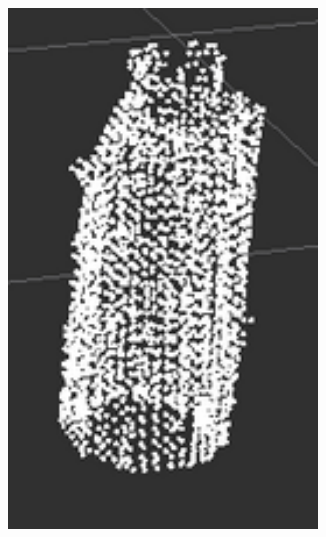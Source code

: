 \begin{figure}[htb]
\begin{subfigure}[b]{0.3\textwidth}
\begin{center}
			\includegraphics[width=0.9\textwidth]{graphics/07_modelling/bottle.png}
			\end{center}
        \end{subfigure} 
        \begin{subfigure}[b]{0.3\textwidth}
        \begin{center}

\end{center}
\end{subfigure}
\end{figure}
